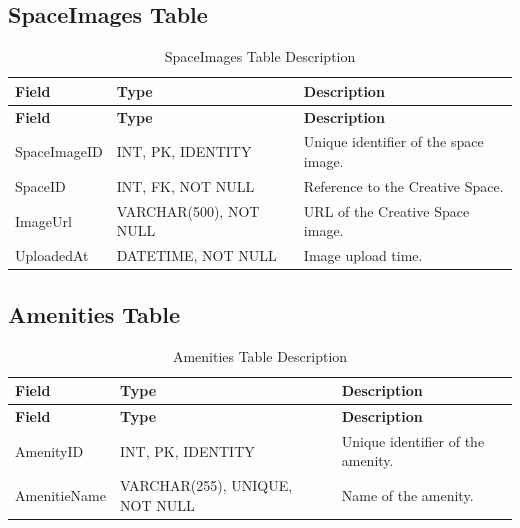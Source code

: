 \subsection{SpaceImages Table}

\begin{longtable}{
		|>{\raggedright\arraybackslash}p{3.2cm}|
		>{\raggedright\arraybackslash}p{4.2cm}|
		>{\raggedright\arraybackslash}p{5.0cm}|
	}
	\caption{SpaceImages Table Description}
	\label{tab:space-images}\\
	\hline
	\textbf{Field} & \textbf{Type} & \textbf{Description} \\ \hline
	\endfirsthead
	\hline
	\textbf{Field} & \textbf{Type} & \textbf{Description} \\ \hline
	\endhead
	
	SpaceImageID & INT, PK, IDENTITY &
	Unique identifier of the space image. \\ \hline
	
	SpaceID & INT, FK, NOT NULL &
	Reference to the Creative Space. \\ \hline
	
	ImageUrl & VARCHAR(500), NOT NULL &
	URL of the Creative Space image. \\ \hline
	
	UploadedAt & DATETIME, NOT NULL &
	Image upload time. \\ \hline
	
\end{longtable}


\subsection{Amenities Table}

\begin{longtable}{
		|>{\raggedright\arraybackslash}p{3.2cm}|
		>{\raggedright\arraybackslash}p{4.2cm}|
		>{\raggedright\arraybackslash}p{5.0cm}|
	}
	\caption{Amenities Table Description}
	\label{tab:amenities}\\
	\hline
	\textbf{Field} & \textbf{Type} & \textbf{Description} \\ \hline
	\endfirsthead
	\hline
	\textbf{Field} & \textbf{Type} & \textbf{Description} \\ \hline
	\endhead
	
	AmenityID & INT, PK, IDENTITY &
	Unique identifier of the amenity. \\ \hline
	
	AmenitieName & VARCHAR(255), UNIQUE, NOT NULL &
	Name of the amenity. \\ \hline
	
\end{longtable}


